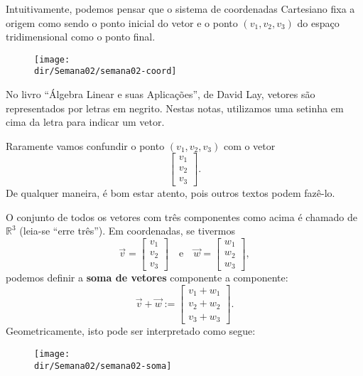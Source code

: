 \documentclass[../livro.tex]{subfiles}  %
\providecommand{\dir}{..}
\begin{document}
\noindent Intuitivamente, podemos pensar que o sistema de coordenadas Cartesiano fixa a origem como sendo o ponto inicial do vetor e o ponto $(v_1, v_2, v_3)$ do espaço tridimensional como o ponto final. 

\begin{figure}[h!]
\begin{center}
\texttt{[image: \\dir/Semana02/semana02-coord]}
\end{center}
\end{figure}

No livro ``Álgebra Linear e suas Aplicações'', de David Lay, vetores são representados por letras em negrito. Nestas notas, utilizamos uma setinha em cima da letra para indicar um vetor.

Raramente vamos confundir o ponto $(v_1, v_2, v_3)$ com o vetor
\begin{equation}
\left[
\begin{array}{c}
v_1 \\
v_2 \\
v_3
\end{array}
\right].
\end{equation} De qualquer maneira, é bom estar atento, pois outros textos podem fazê-lo.

O conjunto de todos os vetores com três componentes como acima é chamado de $\mathbb{R}^3$ (leia-se ``erre três''). Em coordenadas, se tivermos
\begin{equation}
\vec{v} =
\left[
  \begin{array}{c}
    v_1 \\
    v_2 \\
    v_3
  \end{array}
\right]  \quad  \text{e} \quad
\vec{w} =
\left[
  \begin{array}{c}
    w_1 \\
    w_2 \\
    w_3
  \end{array}
\right],
\end{equation} podemos definir a \textbf{soma de vetores} componente a componente:
\begin{equation}
\vec{v} + \vec{w} :=
\left[
  \begin{array}{c}
    v_1 + w_1 \\
    v_2 + w_2 \\
    v_3 + w_3
  \end{array}
\right].
\end{equation} Geometricamente, isto pode ser interpretado como segue:
\begin{figure}[h!]
\begin{center}
\texttt{[image: \\dir/Semana02/semana02-soma]}
\end{center}
\end{figure}
\end{document}
